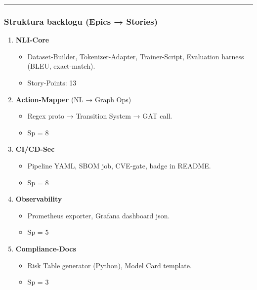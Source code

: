\documentclass[letterpaper,twocolumn]{article}
\providecommand{\tightlist}{%
  \setlength{\itemsep}{0pt}\setlength{\parskip}{0pt}}
\begin{document}
\begin{center}\rule{0.5\linewidth}{0.5pt}\end{center}

\hypertarget{struktura-backlogu-epics-stories}{%
\subsubsection{Struktura backlogu (Epics →
Stories)}\label{struktura-backlogu-epics-stories}}

\begin{enumerate}
\def\labelenumi{\arabic{enumi}.}
\item
  \textbf{NLI-Core}

  \begin{itemize}
  \tightlist
  \item
    Dataset-Builder, Tokenizer-Adapter, Trainer-Script, Evaluation
    harness (BLEU, exact-match).
  \item
    Story-Points: 13
  \end{itemize}
\item
  \textbf{Action-Mapper} (NL → Graph Ops)

  \begin{itemize}
  \tightlist
  \item
    Regex proto → Transition System → GAT call.
  \item
    Sp = 8
  \end{itemize}
\item
  \textbf{CI/CD-Sec}

  \begin{itemize}
  \tightlist
  \item
    Pipeline YAML, SBOM job, CVE-gate, badge in README.
  \item
    Sp = 8
  \end{itemize}
\item
  \textbf{Observability}

  \begin{itemize}
  \tightlist
  \item
    Prometheus exporter, Grafana dashboard json.
  \item
    Sp = 5
  \end{itemize}
\item
  \textbf{Compliance-Docs}

  \begin{itemize}
  \tightlist
  \item
    Risk Table generator (Python), Model Card template.
  \item
    Sp = 3
  \end{itemize}
\end{enumerate}
\end{document}
